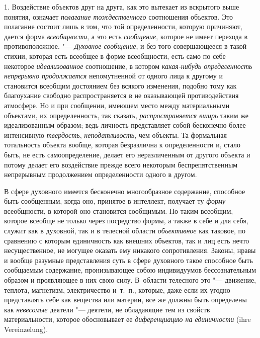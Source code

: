 1. Воздействие объектов друг на друга, как это вытекает из
вскрытого выше понятия, означает
{\em полагание тождественного}
соотношения объектов. Это полагание состоит лишь в том, что
той определенности, которую
причиняют,
дается форма
{\em всеобщности}, а это
есть {\em сообщение},
которое не имеет перехода в противоположное. "---
{\em Духовное сообщение},
и без того совершающееся в такой стихии, которая есть
всеобщее в форме всеобщности, есть само по себе некоторое
{\em идеализованное}
соотношение, в котором
{\em какая-нибудь определенность
непрерывно продолжается} непомутненной от одного лица к
другому и становится всеобщим достоянием без всякого изменения, подобно
тому как благоухание свободно распространяется в не оказывающей
противодействия атмосфере. Но и при сообщении, имеющем место между
материальными объектами, их определенность, так сказать,
{\em распространяется вширь}
таким же идеализованным образом; ведь личность представляет
собой бесконечно более интенсивную
{\em твердость},{\em
неподатливость}, чем объекты. Та формальная
тотальность объекта вообще, которая безразлична к определенности и, стало
быть, не есть самоопределение, делает его неразличенным от другого объекта
и потому делает его воздействие прежде всего некоторым беспрепятственным
непрерывным продолжением определенности одного в другом.

В сфере духовного имеется бесконечно многообразное содержание,
способное быть сообщенным, когда оно, принятое в интеллект, получает ту
{\em форму} всеобщности,
в которой оно становится сообщимым. Но таким всеобщим, которое всеобще не
только через посредство формы, а также в себе и для себя, служит как в
духовной, так и в телесной области
{\em объективное} как
таковое, по сравнению с которым единичность как внешних объектов, так и лиц
есть нечто несущественное, не могущее оказать ему никакого сопротивления.
Законы, нравы и вообще разумные представления суть в сфере духовного такое
способное быть сообщаемым содержание, пронизывающее собою индивидуумов
бессознательным образом и проявляющее в них свою силу. В~области телесного
это "--- движение, теплота, магнетизм, электричество и~т.~п.,
которые, даже если их угодно представлять себе как вещества или материи,
все же должны быть определены как
{\em невесомые} деятели
"--- деятели, не обладающие тем из свойств материальности,
которое обосновывает ее
{\em диференциацию на единичности} (ihre Vereinzelung).

